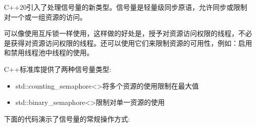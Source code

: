 
C++20引入了处理信号量的新类型。信号量是轻量级同步原语，允许同步或限制对一个或一组资源的访问。

可以像使用互斥锁一样使用，这样做的好处是，授予对资源访问权限的线程，不必是获得对资源访问权限的线程。还可以使用它们来限制资源的可用性，例如：启用和禁用线程池中线程的使用。

C++标准库提供了两种信号量类型:

\begin{itemize}
\item
std::counting\_semaphore<>将多个资源的使用限制在最大值

\item
std::binary\_semaphore<>限制对单一资源的使用
\end{itemize}


下面的代码演示了信号量的常规操作方式:


